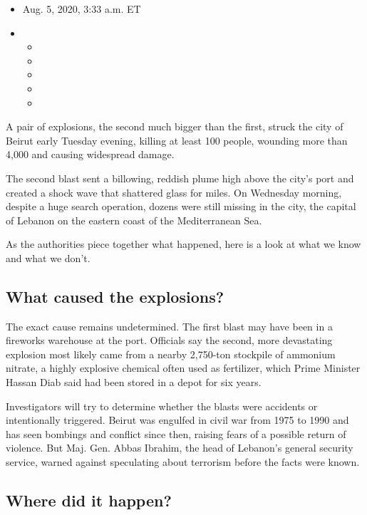\begin{itemize}
\item
  Aug. 5, 2020, 3:33 a.m. ET
\item
  \begin{itemize}
  \item
  \item
  \item
  \item
  \item
  \end{itemize}
\end{itemize}

A pair of explosions, the second much bigger than the first, struck the
city of Beirut early Tuesday evening, killing at least 100 people,
wounding more than 4,000 and causing widespread damage.

The second blast sent a billowing, reddish plume high above the city's
port and created a shock wave that shattered glass for miles. On
Wednesday morning, despite a huge search operation, dozens were still
missing in the city, the capital of Lebanon on the eastern coast of the
Mediterranean Sea.

As the authorities piece together what happened, here is a look at what
we know and what we don't.

\hypertarget{what-caused-the-explosions}{%
\subsection{What caused the
explosions?}\label{what-caused-the-explosions}}

The exact cause remains undetermined. The first blast may have been in a
fireworks warehouse at the port. Officials say the second, more
devastating explosion most likely came from a nearby 2,750-ton stockpile
of ammonium nitrate, a highly explosive chemical often used as
fertilizer, which Prime Minister Hassan Diab said had been stored in a
depot for six years.

Investigators will try to determine whether the blasts were accidents or
intentionally triggered. Beirut was engulfed in civil war from 1975 to
1990 and has seen bombings and conflict since then, raising fears of a
possible return of violence. But Maj. Gen. Abbas Ibrahim, the head of
Lebanon's general security service, warned against speculating about
terrorism before the facts were known.

\hypertarget{where-did-it-happen}{%
\subsection{Where did it happen?}\label{where-did-it-happen}}

